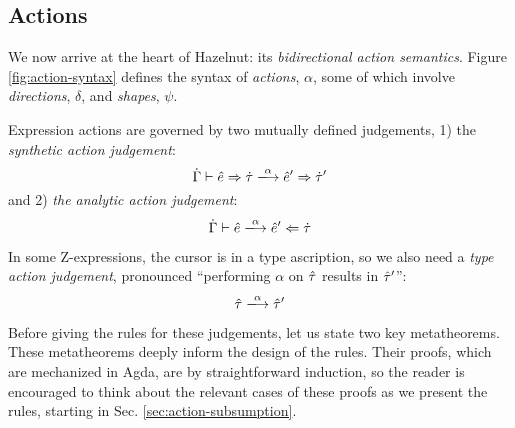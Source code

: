 \subsection{Actions}\label{sec:actions}


We now arrive at the heart of Hazelnut: its \emph{bidirectional action semantics}.  
Figure \ref{fig:action-syntax} defines the syntax of \emph{actions}, $\alpha$, some of which involve \emph{directions}, $\delta$, and \emph{shapes}, $\psi$. 

Expression actions are governed by two mutually defined judgements, 1) the \emph{synthetic action judgement}:
\[
\performSyn{\hGamma}{\zexp}{\htau}{\alpha}{\zexp'}{\htau'}
\]
and 2) \emph{the analytic action judgement}:
\[
\performAna{\hGamma}{\zexp}{\htau}{\alpha}{\zexp'}
\]

In some Z-expressions, the cursor is in a type ascription, so we also need a \emph{type action judgement}, pronounced ``performing $\alpha$ on $\hat{\tau}$ results in $\hat{\tau}'$'':
\[
\performTyp{\ztau}{\alpha}{\ztau'}
\]


Before giving the rules for these judgements, let us state two key metatheorems. These metatheorems deeply inform the design of the rules. Their proofs, which are mechanized in Agda, are by straightforward induction, so the reader is encouraged to think about the relevant cases of these proofs as we present the rules, starting in Sec. \ref{sec:action-subsumption}.

